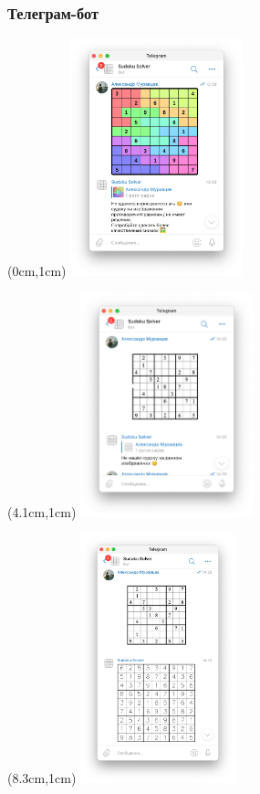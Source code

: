 \documentclass{beamer}
\begin{document}
\begin{frame}
\frametitle{Телеграм-бот}
\begin{textblock*}{5cm}(0cm,1cm)
\includegraphics[width=5cm]{telegram_screen_3}
\end{textblock*}

\begin{textblock*}{5cm}(4.1cm,1cm)
\includegraphics[width=5cm]{telegram_screen_4}
\end{textblock*}

\begin{textblock*}{4.5cm}(8.3cm,1cm)
\includegraphics[width=4.5cm]{telegram_screen_5}
\end{textblock*}

\end{frame}
\end{document}
